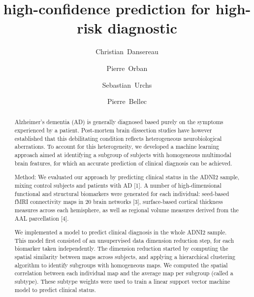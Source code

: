 \documentclass[authoryear]{elsarticle}
\begin{document}
\begin{frontmatter}

\title{high-confidence prediction for high-risk diagnostic}

\author[a,b]{Christian~Dansereau}
\author[a]{Pierre~Orban}
\author[c]{Sebastian~Urchs}
\author[a,b]{Pierre~Bellec}
\address[a]{Centre de Recherche de l'Institut Universitaire de G\'eriatrie de Montr\'eal, Montr\'eal, CA}
\address[b]{D\'epartement d'Informatique et de recherche op\'erationnelle, Universit\'e de Montr\'eal, Montr\'eal,CA}
\address[c]{Integrated Program in Neuroscience, McGill University, Montr\'eal,CA}
%

\begin{abstract}
Alzheimer’s dementia (AD) is generally diagnosed based purely on the symptoms experienced by a patient. Post-mortem brain dissection studies have however established that this debilitating condition reflects heterogeneous neurobiological aberrations. To account for this heterogeneity, we developed a machine learning approach aimed at identifying a subgroup of subjects with homogeneous multimodal brain features, for which an accurate prediction of clinical diagnosis can be achieved. 

Method: 
We evaluated our approach by predicting clinical status in the ADNI2 sample, mixing control subjects and patients with AD [1]. A number of high-dimensional functional and structural biomarkers were generated for each individual: seed-based fMRI connectivity maps in 20 brain networks [3], surface-based cortical thickness measures across each hemisphere, as well as regional volume measures derived from the AAL parcellation [4]. 

We implemented a model to predict clinical diagnosis in the whole ADNI2 sample. This model first consisted of an unsupervised data dimension reduction step, for each biomarker taken independently. The dimension reduction started by computing the spatial similarity between maps across subjects, and applying a hierarchical clustering algorithm to identify subgroups with homogeneous maps. We computed the spatial correlation between each individual map and the average map per subgroup (called a subtype). These subtype weights were used to train a linear support vector machine model to predict clinical status. 


\end{abstract}
\end{frontmatter}
\end{document}
